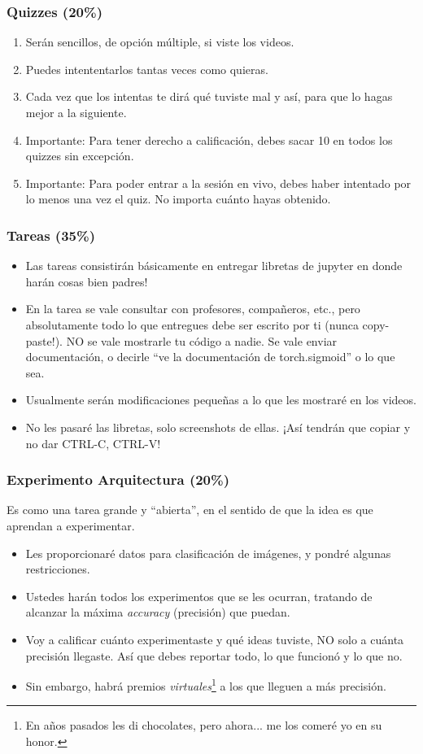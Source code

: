\documentclass[spanish]{beamer}
\def\tcr#1{\textcolor{MyRed}{#1}}
\def\tcg#1{\textcolor{MyGreen}{#1}}
\begin{document}
\begin{frame}\frametitle{Quizzes (20\%)}
    \begin{enumerate}
     \item Serán sencillos, de opción múltiple, si viste los videos.\pause
     \item Puedes intententarlos tantas veces como quieras. \pause
     \item Cada vez que los intentas te dirá qué tuviste mal y así, para que lo hagas mejor a la siguiente.\pause
     \item \tcr{Importante:} Para tener derecho a calificación, \tcg{debes sacar 10 en todos los quizzes sin excepción}.\pause
     \item \tcr{Importante:} Para poder entrar a la sesión en vivo, \tcg{debes haber intentado por lo menos una vez el quiz}. No importa cuánto hayas obtenido.
    \end{enumerate}
\end{frame}


\begin{frame}\frametitle{Tareas (35\%)}
\begin{itemize}
 \item Las tareas consistirán básicamente en entregar libretas de jupyter en donde harán cosas bien padres!\pause
 \item En la tarea \tcg{se vale consultar con profesores, compañeros, etc.}, pero absolutamente todo lo que entregues debe ser escrito por ti (nunca copy-paste!). \tcr{NO} se vale mostrarle tu código a nadie. Se vale enviar documentación, o decirle ``ve la documentación de torch.sigmoid'' o lo que sea.\pause
 \item Usualmente serán modificaciones pequeñas a lo que les mostraré en los videos.\pause
 \item No les pasaré las libretas, solo screenshots de ellas. ¡Así tendrán que copiar y no dar CTRL-C, CTRL-V!
\end{itemize}
\end{frame}

\begin{frame}\frametitle{Experimento Arquitectura (20\%)}
Es como una tarea grande y ``abierta'', en el sentido de que la idea es que aprendan a experimentar.\pause
 \begin{itemize}
  \item Les proporcionaré datos para clasificación de imágenes, y pondré algunas restricciones. \pause
  \item Ustedes harán todos los experimentos que se les ocurran, tratando de alcanzar la máxima \textit{accuracy} (precisión) que puedan.\pause
  \item Voy a calificar cuánto experimentaste y qué ideas tuviste, NO solo a cuánta precisión llegaste. Así que debes reportar todo, lo que funcionó y lo que no.\pause
  \item Sin embargo, habrá premios \textit{virtuales}\footnote{En años pasados les di chocolates, pero ahora... me los comeré yo en su honor.} a los que lleguen a más precisión.
 \end{itemize}
\end{frame}
\end{document}
